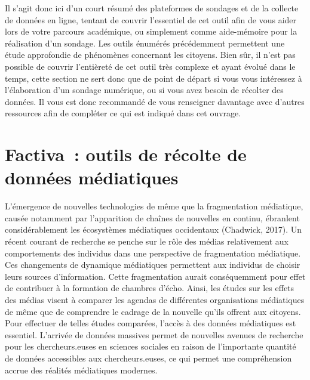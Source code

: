 \documentclass[
  letterpaper,
]{scrbook}
\begin{document}
Il s'agit donc ici d'un court résumé des plateformes de sondages et de
la collecte de données en ligne, tentant de couvrir l'essentiel de cet
outil afin de vous aider lors de votre parcours académique, ou
simplement comme aide-mémoire pour la réalisation d'un sondage. Les
outils énumérés précédemment permettent une étude approfondie de
phénomènes concernant les citoyens. Bien sûr, il n'est pas possible de
couvrir l'entièreté de cet outil très complexe et ayant évolué dans le
temps, cette section ne sert donc que de point de départ si vous vous
intéressez à l'élaboration d'un sondage numérique, ou si vous avez
besoin de récolter des données. Il vous est donc recommandé de vous
renseigner davantage avec d'autres ressources afin de compléter ce qui
est indiqué dans cet ouvrage.

\hypertarget{factiva-outils-de-ruxe9colte-de-donnuxe9es-muxe9diatiques}{%
\section{\texorpdfstring{\textbf{Factiva~: outils de récolte de données
médiatiques}}{Factiva~: outils de récolte de données médiatiques}}\label{factiva-outils-de-ruxe9colte-de-donnuxe9es-muxe9diatiques}}

L'émergence de nouvelles technologies de même que la fragmentation
médiatique, causée notamment par l'apparition de chaînes de nouvelles en
continu, ébranlent considérablement les écosystèmes médiatiques
occidentaux (Chadwick, 2017). Un récent courant de recherche se penche
sur le rôle des médias relativement aux comportements des individus dans
une perspective de fragmentation médiatique. Ces changements de
dynamique médiatiques permettent aux individus de choisir leurs sources
d'information. Cette fragmentation aurait conséquemment pour effet de
contribuer à la formation de chambres d'écho. Ainsi, les études sur les
effets des médias visent à comparer les agendas de différentes
organisations médiatiques de même que de comprendre le cadrage de la
nouvelle qu'ils offrent aux citoyens. Pour effectuer de telles études
comparées, l'accès à des données médiatiques est essentiel. L'arrivée de
données massives permet de nouvelles avenues de recherche pour les
chercheurs.euses en sciences sociales en raison de l'importante quantité
de données accessibles aux chercheurs.euses, ce qui permet une
compréhension accrue des réalités médiatiques modernes.
\end{document}
